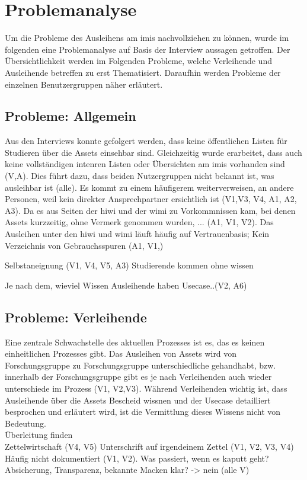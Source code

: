 

\section{Problemanalyse}
\label{section:iststand}
        
Um die Probleme des Ausleihens am \ac{imis} nachvollziehen zu können, wurde im folgenden eine
Problemanalyse auf Basis der Interview aussagen getroffen. 
Der Übersichtlichkeit werden im Folgenden Probleme, welche Verleihende und Ausleihende betreffen zu
erst Thematisiert. Daraufhin werden Probleme der einzelnen Benutzergruppen näher erläutert.

\subsection*{Probleme: Allgemein}
Aus den Interviews konnte gefolgert werden, dass keine öffentlichen Listen für Studieren über die
Assets einsehbar sind. Gleichzeitig wurde erarbeitet, dass auch keine vollständigen intenren Listen
oder Übersichten am \ac{imis} vorhanden sind (V,A). Dies führt dazu, dass beiden Nutzergruppen nicht
bekannt ist, was ausleihbar ist (alle). Es kommt zu einem häufigerem weiterverweisen, an andere
Personen, weil kein direkter Ansprechpartner ersichtlich ist (V1,V3, V4, A1, A2, A3). Da es aus Seiten
der \ac{hiwi} und der \ac{wimi} zu Vorkommnissen kam, bei denen Assets kurzzeitig, ohne Vermerk
genommen wurden, ... (A1, V1, V2). Das Ausleihen unter den \ac{hiwi} und \ac{wimi} läuft häufig auf
Vertrauenbasis; Kein Verzeichnis von Gebrauchsspuren (A1, V1,)

Selbstaneignung (V1, V4, V5, A3) Studierende kommen ohne wissen 

Je nach dem, wieviel Wissen Ausleihende haben Usecase..(V2, A6)

\subsection*{Probleme: Verleihende}
Eine zentrale Schwachstelle des aktuellen Prozesses ist es, das es keinen einheitlichen Prozesses
gibt. Das Ausleihen von Assets wird von Forschungsgruppe zu Forschungsgruppe unterschiedliche
gehandhabt, bzw. innerhalb der Forschungsgruppe gibt es je nach Verleihenden auch wieder
unterschiede im Prozess (V1, V2,V3). Während Verleihenden wichtig ist, dass Ausleihende über die
Assets Bescheid wissnen und der Usecase detailliert besprochen und erläutert wird, ist die
Vermittlung dieses Wissens nicht von Bedeutung. \\
Überleitung finden\\
Zettelwirtschaft (V4, V5) Unterschrift auf irgendeinem Zettel (V1, V2, V3, V4) Häufig nicht
dokumentiert (V1, V2). Was passiert, wenn es kaputt geht? Absicherung, Transparenz, bekannte Macken
klar? -> nein (alle V)

